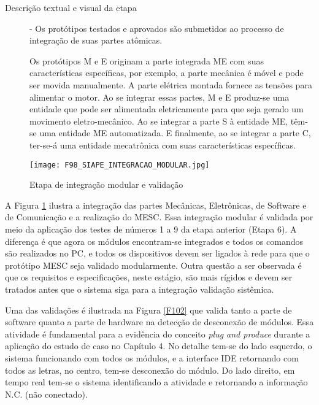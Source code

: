 \begin{description}
\item[Descrição textual e visual da etapa] - Os protótipos testados e aprovados são submetidos ao processo de integração de suas partes atômicas. \par 
Os protótipos M e E originam a parte integrada ME com suas características específicas, por exemplo, a parte mecânica é móvel e pode ser movida manualmente. A parte elétrica montada fornece as tensões para alimentar o motor. Ao se integrar essas partes, M e E produz-se uma entidade que pode ser alimentada eletricamente para que seja gerado um movimento eletro-mecânico. Ao se integrar a parte S à entidade ME, têm-se uma entidade ME automatizada. E finalmente, ao se integrar a parte C, ter-se-á uma entidade mecatrônica com suas características específicas.


\end{description}


\begin{figure}[h]
	\centering
	\texttt{[image: F98\_SIAPE\_INTEGRACAO\_MODULAR.jpg]} 
	\caption{Etapa de integração modular e validação}
	\label{F98}
\end{figure}


A Figura \ref{F98} ilustra a integração das partes Mecânicas, Eletrônicas, de Software e de Comunicação  e a realização do MESC. Essa integração modular é validada por meio da aplicação dos testes de números 1 a 9 da etapa anterior (Etapa 6). A diferença é que agora os módulos encontram-se integrados e todos os comandos são realizados no PC, e todos os dispositivos devem ser ligados à rede para que o protótipo MESC seja validado modularmente. Outra questão a ser observada é que os requisitos e especificações, neste estágio, são mais rígidos e devem ser tratados antes que o sistema siga para a integração validação sistêmica.    


Uma das validações é ilustrada na Figura \ref{F102} que valida tanto a parte de software quanto a parte de hardware na detecção de desconexão de módulos. Essa atividade é fundamental para a evidência do conceito \textit{plug and produce} durante a aplicação do estudo de caso no Capítulo 4. No detalhe tem-se do lado esquerdo, o sistema funcionando com todos os módulos, e a interface IDE retornando com todos as letras, no centro, tem-se desconexão do módulo. Do lado direito, em tempo real tem-se o sistema identificando a atividade e retornando a informação N.C. (não conectado).

